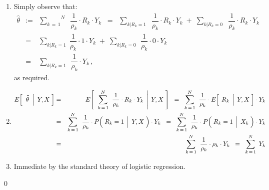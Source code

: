 \begin{enumerate}
\item
	Simply observe that:
	\begin{eqnarray*}
	\widehat{\theta}
	& := &
		\overset{N}{\underset{k\,=\,1}{\sum}}\;\;
		\dfrac{1}{\rho_{k}} \cdot R_{k} \cdot Y_{k}
	\;\; = \;\;
		\underset{k\vert R_{k}=1}{\sum}\;\; \dfrac{1}{\rho_{k}} \cdot R_{k} \cdot Y_{k}
		\; + \;
		\underset{k\vert R_{k}=0}{\sum}\;\; \dfrac{1}{\rho_{k}} \cdot R_{k} \cdot Y_{k}
	\\
	& = &
		\underset{k\vert R_{k}=1}{\sum}\; \dfrac{1}{\rho_{k}} \cdot 1 \cdot Y_{k}
		\; + \;
		\underset{k\vert R_{k}=0}{\sum}\;\, \dfrac{1}{\rho_{k}} \cdot 0 \cdot Y_{k}
	\\
	& = &
		\underset{k\vert R_{k}=1}{\sum}\;\, \dfrac{1}{\rho_{k}} \cdot Y_{k}\,,
	\end{eqnarray*}
	as required.
\item
	\begin{eqnarray*}
	E\!\left[\;\,\left.\widehat{\theta}\;\;\right\vert\;Y,X\;\right]
	& = &
		E\!\left[\;\,
			\left.
			\overset{N}{\underset{k\,=\,1}{\sum}}\;\;
			\dfrac{1}{\rho_{k}} \cdot R_{k} \cdot Y_{k}
			\,\;\right\vert\;
			Y,X
			\;\right]
	\;\; = \;\;
		\overset{N}{\underset{k\,=\,1}{\sum}}\;\;
		\dfrac{1}{\rho_{k}}
		\cdot
		E\!\left[\;
			\left.
			\overset{{\color{white}.}}{R}_{k} 
			\,\;\right\vert\;
			Y,X
			\;\right]
		\cdot Y_{k}
	\\
	& = &
		\overset{N}{\underset{k\,=\,1}{\sum}}\;\;
		\dfrac{1}{\rho_{k}}
		\cdot
		P\!\left(\,
			\left.
			\overset{{\color{white}.}}{R}_{k}=1
			\,\;\right\vert\;
			Y,X
			\;\right)
		\cdot Y_{k}
	\;\; = \;\;
		\overset{N}{\underset{k\,=\,1}{\sum}}\;\;
		\dfrac{1}{\rho_{k}}
		\cdot
		P\!\left(\,
			\left.
			\overset{{\color{white}.}}{R}_{k}=1
			\,\;\right\vert\;
			X_{k}
			\;\right)
		\cdot Y_{k}
	\\
	& = &
		\overset{N}{\underset{k\,=\,1}{\sum}}\;\;
		\dfrac{1}{\rho_{k}} \cdot \rho_{k} \cdot Y_{k}
	\;\; = \;\;
		\overset{N}{\underset{k\,=\,1}{\sum}}\;\, Y_{k}
	\end{eqnarray*}
\item
	Immediate by the standard theory of logistic regression.
\end{enumerate}
\qed


\renewcommand{\theenumi}{\roman{enumi}}
\renewcommand{\labelenumi}{\textnormal{(\theenumi)}$\;\;$}


